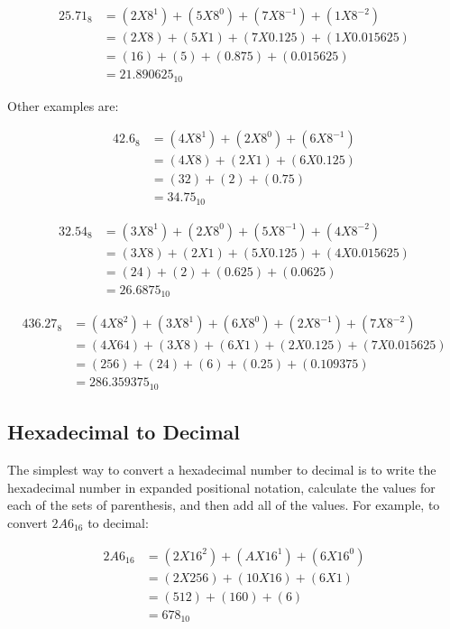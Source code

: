 \begin{align}
  25.71_8 &= (2X8^1)+(5X8^0)+(7X8^{-1})+(1X8^{-2}) \\
  \nonumber
  &= (2X8)+(5X1)+(7X0.125)+(1X0.015625) \\
  \nonumber
  &= (16)+(5)+(0.875)+(0.015625) \\
  \nonumber
  &= 21.890625_{10}
\end{align}

Other examples are:

\begin{align}
  42.6_8 &= (4X8^1)+(2X8^0)+(6X8^{-1}) \\
  \nonumber
  &= (4X8)+(2X1)+(6X0.125) \\
  \nonumber
  &= (32)+(2)+(0.75) \\
  \nonumber
  &= 34.75_{10}
\end{align}

\begin{align}
  32.54_8 &= (3X8^1)+(2X8^0)+(5X8^{-1})+(4X8^{-2}) \\
  \nonumber
  &= (3X8)+(2X1)+(5X0.125)+(4X0.015625) \\
  \nonumber
  &= (24)+(2)+(0.625)+(0.0625) \\
  \nonumber
  &= 26.6875_{10}
\end{align}

\begin{align}
  436.27_8 &= (4X8^2)+(3X8^1)+(6X8^0)+(2X8^{-1})+(7X8^{-2}) \\
  \nonumber
  &= (4X64)+(3X8)+(6X1)+(2X0.125)+(7X0.015625) \\
  \nonumber
  &= (256)+(24)+(6)+(0.25)+(0.109375) \\
  \nonumber
  &= 286.359375_{10}
\end{align}

\subsection{Hexadecimal to Decimal} 
\label{MF:sub:hexadecimal_to_decimal}
The simplest way to convert a hexadecimal number to decimal is to write the hexadecimal number in expanded positional notation, calculate the values for each of the sets of parenthesis, and then add all of the values. For example, to convert $ 2A6_{16} $ to decimal:

\begin{align}
  2A6_{16} &= (2X16^2)+(AX16^1)+(6X16^0) \\
  \nonumber
  &= (2X256)+(10X16)+(6X1) \\
  \nonumber
  &= (512)+(160)+(6) \\
  \nonumber
  &= 678_{10}
\end{align}


